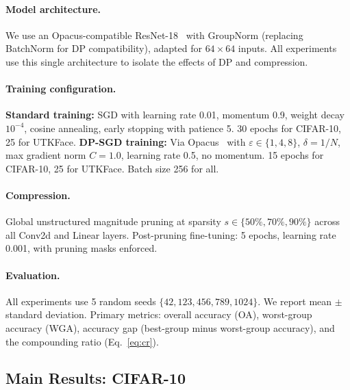 \documentclass{article}
\begin{document}
\paragraph{Model architecture.}
We use an Opacus-compatible ResNet-18~\citep{he2016deep} with GroupNorm (replacing BatchNorm for DP compatibility), adapted for $64{\times}64$ inputs. All experiments use this single architecture to isolate the effects of DP and compression.

\paragraph{Training configuration.}
\textbf{Standard training:} SGD with learning rate 0.01, momentum 0.9, weight decay $10^{-4}$, cosine annealing, early stopping with patience 5. 30 epochs for CIFAR-10, 25 for UTKFace.
\textbf{DP-SGD training:} Via Opacus~\citep{yousefpour2021opacus} with $\varepsilon \in \{1, 4, 8\}$, $\delta = 1/N$, max gradient norm $C = 1.0$, learning rate 0.5, no momentum. 15 epochs for CIFAR-10, 25 for UTKFace. Batch size 256 for all.

\paragraph{Compression.}
Global unstructured magnitude pruning at sparsity $s \in \{50\%, 70\%, 90\%\}$ across all Conv2d and Linear layers. Post-pruning fine-tuning: 5 epochs, learning rate 0.001, with pruning masks enforced.

\paragraph{Evaluation.}
All experiments use 5 random seeds $\{42, 123, 456, 789, 1024\}$. We report mean $\pm$ standard deviation. Primary metrics: overall accuracy (OA), worst-group accuracy (WGA), accuracy gap (best-group minus worst-group accuracy), and the compounding ratio (Eq.~\ref{eq:cr}).

\subsection{Main Results: CIFAR-10}
\label{sec:results_cifar10}
\end{document}
